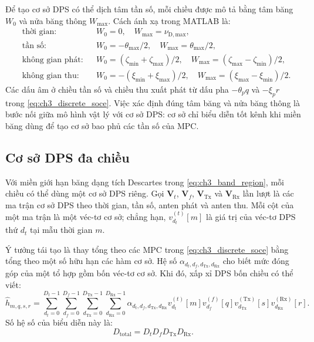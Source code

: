 Để tạo cơ sở DPS có thể dịch tâm tần số, mỗi chiều được mô tả bằng tâm băng \(W_0\) và nửa băng thông \(W_{\max}\). Cách ánh xạ trong MATLAB là:
\begin{equation}
\begin{aligned}
&\text{thời gian:}      && W_0=0,\quad W_{\max}=\nu_{\mathrm{D,max}},\\
&\text{tần số:}         && W_0=-\theta_{\max}/2,\quad W_{\max}=\theta_{\max}/2,\\
&\text{không gian phát:}&& W_0=(\zeta_{\min}+\zeta_{\max})/2,\quad
W_{\max}=(\zeta_{\max}-\zeta_{\min})/2,\\
&\text{không gian thu:} && W_0=-(\xi_{\min}+\xi_{\max})/2,\quad
W_{\max}=(\xi_{\max}-\xi_{\min})/2.
\end{aligned}
\label{eq:ch3_dps_band_mapping}
\end{equation}
Các dấu âm ở chiều tần số và chiều thu xuất phát từ dấu pha \(-\theta_p q\) và \(-\xi_p r\) trong \eqref{eq:ch3_discrete_soce}. Việc xác định đúng tâm băng và nửa băng thông là bước nối giữa mô hình vật lý với cơ sở DPS: cơ sở chỉ biểu diễn tốt kênh khi miền băng dùng để tạo cơ sở bao phủ các tần số của MPC.

\subsection{Cơ sở DPS đa chiều}
\label{subsec:ch3_multidim_dps}

Với miền giới hạn băng dạng tích Descartes trong \eqref{eq:ch3_band_region}, mỗi chiều có thể dùng một cơ sở DPS riêng. Gọi \(\mathbf{V}_t\), \(\mathbf{V}_f\), \(\mathbf{V}_{\mathrm{Tx}}\) và \(\mathbf{V}_{\mathrm{Rx}}\) lần lượt là các ma trận cơ sở DPS theo thời gian, tần số, anten phát và anten thu. Mỗi cột của một ma trận là một véc-tơ cơ sở; chẳng hạn, \(v^{(t)}_{d_t}[m]\) là giá trị của véc-tơ DPS thứ \(d_t\) tại mẫu thời gian \(m\).

Ý tưởng tái tạo là thay tổng theo các MPC trong \eqref{eq:ch3_discrete_soce} bằng tổng theo một số hữu hạn các hàm cơ sở. Hệ số \(\alpha_{d_t,d_f,d_{\mathrm{Tx}},d_{\mathrm{Rx}}}\) cho biết mức đóng góp của một tổ hợp gồm bốn véc-tơ cơ sở. Khi đó, xấp xỉ DPS bốn chiều có thể viết:
\begin{equation}
\hat{h}_{m,q,s,r}
=
\sum_{d_t=0}^{D_t-1}
\sum_{d_f=0}^{D_f-1}
\sum_{d_{\mathrm{Tx}}=0}^{D_{\mathrm{Tx}}-1}
\sum_{d_{\mathrm{Rx}}=0}^{D_{\mathrm{Rx}}-1}
\alpha_{d_t,d_f,d_{\mathrm{Tx}},d_{\mathrm{Rx}}}
v^{(t)}_{d_t}[m]
v^{(f)}_{d_f}[q]
v^{(\mathrm{Tx})}_{d_{\mathrm{Tx}}}[s]
v^{(\mathrm{Rx})}_{d_{\mathrm{Rx}}}[r].
\label{eq:ch3_4d_dps_reconstruction}
\end{equation}
Số hệ số của biểu diễn này là:
\begin{equation}
D_{\mathrm{total}}
=D_tD_fD_{\mathrm{Tx}}D_{\mathrm{Rx}}.
\label{eq:ch3_total_dps_dimension}
\end{equation}

